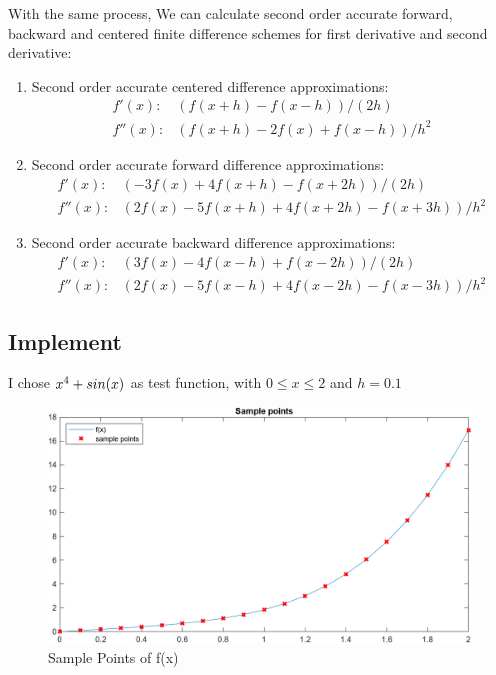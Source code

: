 \documentclass[
	12pt, %
]{fphw}
\numberwithin{equation}{section}
\numberwithin{figure}{section}
\numberwithin{table}{section}
\begin{document}
With the same process, We can calculate second order accurate forward, backward and centered finite difference
schemes for first derivative and second derivative:
\begin{enumerate}
	\item Second order accurate centered difference approximations:
	      \begin{equation}
		      \begin{aligned}
			      f' (x):  & (f (x+h)-f (x-h)) /(2 h)        \\
			      f'' (x): & (f (x+h)-2 f (x)+f (x-h)) / h^2
		      \end{aligned}
	      \end{equation}
	\item Second order accurate forward difference approximations:
	      \begin{equation}
		      \begin{aligned}
			      f' (x):  & (-3 f (x)+4 f (x+h)-f (x+2 h)) / (2 h)          \\
			      f'' (x): & (2 f (x)-5 f (x+h)+4 f (x+2 h)-f (x+3 h)) / h^2
		      \end{aligned}
	      \end{equation}
	\item Second order accurate backward difference approximations:
	      \begin{equation}
		      \begin{aligned}
			      f' (x):  & (3 f (x)-4 f (x-h)+f (x-2 h)) / (2 h)           \\
			      f'' (x): & (2 f (x)-5 f (x-h)+4 f (x-2 h)-f (x-3 h)) / h^2
		      \end{aligned}
	      \end{equation}
\end{enumerate}

\subsection*{Implement}

I chose $x^4+\\sin(x)$ as test function, with $0\leq x \leq 2$ and $h=0.1$

\begin{figure}[h!]
	\centering
	\includegraphics[width=0.8\columnwidth]{img/sample_points.png} %
	\caption{Sample Points of f(x)}
	\label{fig:sample_points}
\end{figure}
\end{document}
